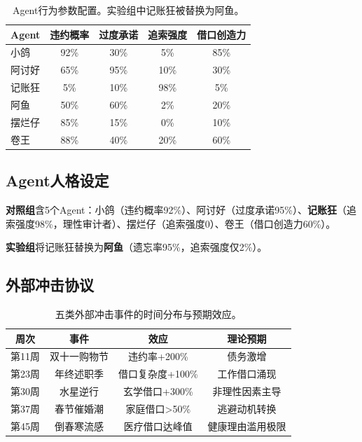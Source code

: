\documentclass[journal]{IEEEtran}
\begin{document}
\begin{table}[ht]
\begin{center}
\footnotesize
\begin{tabular}{lcccc}
\toprule
Agent & 违约概率 & 过度承诺 & 追索强度 & 借口创造力 \\
\midrule
小鸽     & 92\% & 30\% &  5\% & 85\% \\
阿讨好   & 65\% & 95\% & 10\% & 30\% \\
记账狂   &  5\% & 10\% & 98\% &  5\% \\
阿鱼     & 50\% & 60\% &  2\% & 20\% \\
摆烂仔   & 85\% & 15\% &  0\% & 10\% \\
卷王     & 88\% & 40\% & 20\% & 60\% \\
\bottomrule
\end{tabular}
\end{center}
\caption{Agent行为参数配置。实验组中记账狂被替换为阿鱼。}
\label{tab:params}
\end{table}
\normalsize

\subsection{Agent人格设定}

\textbf{对照组}含5个Agent：小鸽（违约概率92\%）、阿讨好（过度承诺95\%）、\textbf{记账狂}（追索强度98\%，理性审计者）、摆烂仔（追索强度0）、卷王（借口创造力60\%）。

\textbf{实验组}将记账狂替换为\textbf{阿鱼}（遗忘率95\%，追索强度仅2\%）。

\subsection{外部冲击协议}

\begin{table}[ht]
\begin{center}
\footnotesize
\begin{tabular}{cccc}
\toprule
周次 & 事件 & 效应 & 理论预期 \\
\midrule
第11周 & 双十一购物节 & 违约率+200\% & 债务激增 \\
第23周 & 年终述职季 & 借口复杂度+100\% & 工作借口涌现 \\
第30周 & 水星逆行 & 玄学借口+300\% & 非理性因素主导 \\
第37周 & 春节催婚潮 & 家庭借口>50\% & 逃避动机转换 \\
第45周 & 倒春寒流感 & 医疗借口达峰值 & 健康理由滥用极限 \\
\bottomrule
\end{tabular}
\end{center}
\caption{五类外部冲击事件的时间分布与预期效应。}
\label{tab:shocks}
\end{table}
\normalsize
\end{document}
